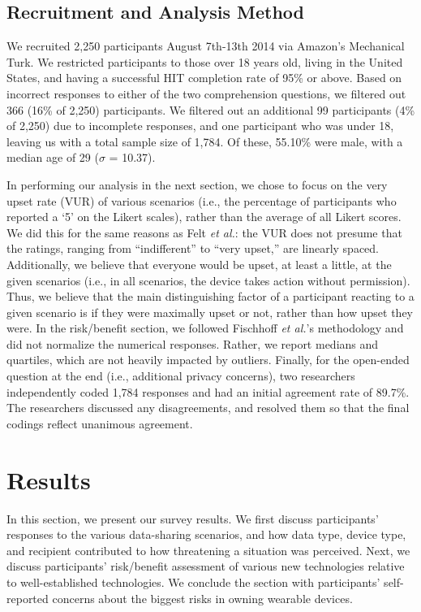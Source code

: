 \documentclass{acm_proc_article-sp}
\begin{document}
\subsection{Recruitment and Analysis Method}
We recruited 2,250 participants August 7th-13th 2014 via Amazon's Mechanical Turk. We restricted participants to those over 18 years old, living in the United States, and having a successful HIT completion rate of 95\% or above. Based on incorrect responses to either of the two comprehension questions, we filtered out 366 (16\% of 2,250) participants. We filtered out an additional 99 participants (4\% of 2,250) due to incomplete responses, and one participant who was under 18, leaving us with a total sample size of 1,784. Of these, 55.10\% were male, with a median age of 29 ($\sigma$ = 10.37).

In performing our analysis in the next section, we chose to focus on the very upset rate (VUR) of various scenarios (i.e., the percentage of participants who reported a `5' on the Likert scales), rather than the average of all Likert scores. We did this for the same reasons as Felt {\it et al.}: the VUR does not presume that the ratings, ranging from ``indifferent'' to ``very upset,'' are linearly spaced. Additionally, we believe that everyone would be upset, at least a little, at the given scenarios (i.e., in all scenarios, the device takes action without permission). Thus, we believe that the main distinguishing factor of a participant reacting to a given scenario is if they were maximally upset or not, rather than how upset they were. In the risk/benefit section, we followed Fischhoff {\it et al.}'s methodology and did not normalize the numerical responses. Rather, we report medians and quartiles, which are not heavily impacted by outliers. Finally, for the open-ended question at the end (i.e., additional privacy concerns), two researchers independently coded 1,784 responses and had an initial agreement rate of 89.7\%. The researchers discussed any disagreements, and resolved them so that the final codings reflect unanimous agreement.


\section{Results}
In this section, we present our survey results. We first discuss participants' responses to the various data-sharing scenarios, and how data type, device type, and recipient contributed to how threatening a situation was perceived. Next, we discuss participants' risk/benefit assessment of various new technologies relative to well-established technologies. We conclude the section with participants' self-reported concerns about the biggest risks in owning wearable devices.
\end{document}
